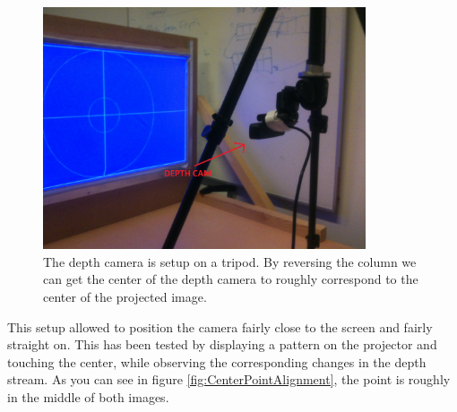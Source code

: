 \documentclass[]{article}
\begin{document}
\begin{figure}[hbtp]
    \centering
    \includegraphics[width=0.85\textwidth]{figures/tripodCamSetup.jpg}
    \caption{The depth camera is setup on a tripod. By reversing the column we can get the center of the depth camera to roughly correspond to the center of the projected image.}
    \label{fig:Tripod}
\end{figure}

This setup allowed to position the camera fairly close to the screen and fairly straight on. This has been tested by displaying a pattern on the projector and touching the center, while observing the corresponding changes in the depth stream. As you can see in figure \ref{fig:CenterPointAlignment}, the point is roughly in the middle of both images.
\end{document}
